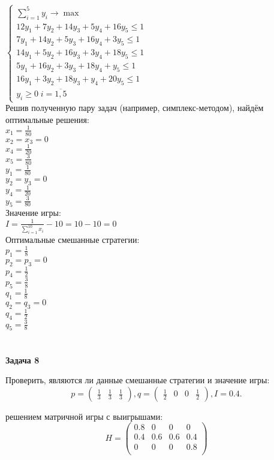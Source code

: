\documentclass[a4paper,14pt]{extreport}
\begin{document}
$\begin{cases}
\displaystyle\sum_{i=1}^{5}y_i \to \max \\
12y_1 + 7y_2 + 14y_3 + 5y_4 + 16y_5 \leq 1 \\
7y_1 + 14y_2 + 5y_3 + 16y_4 + 3y_5 \leq 1 \\
14y_1 + 5y_2 + 16y_3 + 3y_4 + 18y_5 \leq 1 \\
5y_1 + 16y_2 + 3y_3 + 18y_4 + y_5 \leq 1 \\
16y_1 + 3y_2 + 18y_3 + y_4 + 20y_5 \leq 1 \\

y_i \geq 0\; i=\overline{1, 5}
\end{cases}$\\
Решив полученную пару задач (например, симплекс-методом), найдём оптимальные решения:\\
$x_1 = \frac{1}{80}$ \\
$x_2 = x_3 = 0$\\
$x_4 = \frac{1}{20}$\\
$x_5 = \frac{3}{80}$\\
$y_1 = \frac{1}{80}$ \\
$y_2 = y_3 = 0$\\
$y_4 = \frac{1}{20}$\\
$y_5 = \frac{3}{80}$\\
Значение игры: \\
$\displaystyle I = \frac{1}{\sum_{i=1}^{10}x_i} - 10 = 10 - 10 = 0$\\
Оптимальные смешанные стратегии: \\
$p_1 = \frac{1}{8}$ \\
$p_2 = p_3 = 0$\\
$p_4 = \frac{1}{2}$\\
$p_5 = \frac{3}{8}$\\
$q_1 = \frac{1}{8}$ \\
$q_2 = q_3 = 0$\\
$q_4 = \frac{1}{2}$\\
$q_5 = \frac{3}{8}$\\
\\
\\

\textbf{Задача 8}

Проверить, являются ли данные смешанные стратегии и значение игры:
\begin{equation*}
    p = \begin{pmatrix}\frac{1}{3} & \frac{1}{3} & \frac{1}{3} \end{pmatrix}, 
    q = \begin{pmatrix}\frac{1}{2} & 0 & 0  & \frac{1}{2} \end{pmatrix},
    I = 0.4.
\end{equation*} \par
решением матричной игры с выигрышами:
\begin{equation*}
    H = \begin{pmatrix} 
            0.8 & 0 & 0 & 0 \\
            0.4 & 0.6 & 0.6 & 0.4 \\
            0 & 0 & 0 & 0.8 \\
        \end{pmatrix}
\end{equation*}
\end{document}
